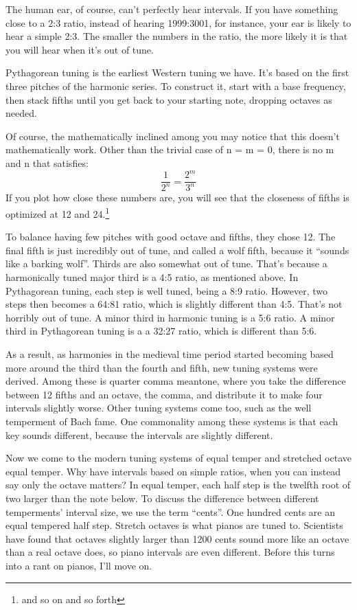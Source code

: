 \documentclass[12pt]{article}[titlepage]
\newcommand{\say}[1]{``#1''}
\newcommand{\1}{\={a}}
\newcommand{\2}{\={e}}
\newcommand{\3}{\={\i}}
\newcommand{\4}{\=o}
\newcommand{\5}{\=u}
\newcommand{\6}{\={A}}
\renewcommand{\,}{\textsuperscript{,}}
\begin{document}
The human ear, of course, can't perfectly hear intervals.
If you have something close to a 2:3 ratio, instead of hearing 1999:3001, for instance, your ear is likely to hear a simple 2:3.
The smaller the numbers in the ratio, the more likely it is that you will hear when it's out of tune.

Pythagorean tuning is the earliest Western tuning we have.
It's based on the first three pitches of the harmonic series.
To construct it, start with a base frequency, then stack fifths until you get back to your starting note, dropping octaves as needed.

Of course, the mathematically inclined among you may notice that this doesn't mathematically work.
Other than the trivial case of n = m = 0, there is no m and n that satisfies:
\begin{equation}
\frac{1}{2^n} = \frac{2^m}{3^n}
\end{equation}
If you plot how close these numbers are, you will see that the closeness of fifths is optimized at 12 and 24.\footnote{and so on and so forth}

To balance having few pitches with good octave and fifths, they chose 12.
The final fifth is just incredibly out of tune, and called a wolf fifth, because it \say{sounds like a barking wolf}.
Thirds are also somewhat out of tune.
That's because a harmonically tuned major third is a 4:5 ratio, as mentioned above.
In Pythagorean tuning, each step is well tuned, being a 8:9 ratio.
However, two steps then becomes a 64:81 ratio, which is slightly different than 4:5.
That's not horribly out of tune.
A minor third in harmonic tuning is a 5:6 ratio.
A minor third in Pythagorean tuning is a a 32:27 ratio, which is different than 5:6.

As a result, as harmonies in the medieval time period started becoming based more around the third than the fourth and fifth, new tuning systems were derived.
Among these is quarter comma meantone, where you take the difference between 12 fifths and an octave, the comma, and distribute it to make four intervals slightly worse.
Other tuning systems come too, such as the well temperment of Bach fame.
One commonality among these systems is that each key sounds different, because the intervals are slightly different.

Now we come to the modern tuning systems of equal temper and stretched octave equal temper.
Why have intervals based on simple ratios, when you can instead say only the octave matters?
In equal temper, each half step is the twelfth root of two larger than the note below. 
To discuss the difference between different temperments' interval size, we use the term \say{cents}.
One hundred cents are an equal tempered half step.
Stretch octaves is what pianos are tuned to.
Scientists have found that octaves slightly larger than 1200 cents sound more like an octave than a real octave does, so piano intervals are even different.
Before this turns into a rant on pianos, I'll move on.
\end{document}
